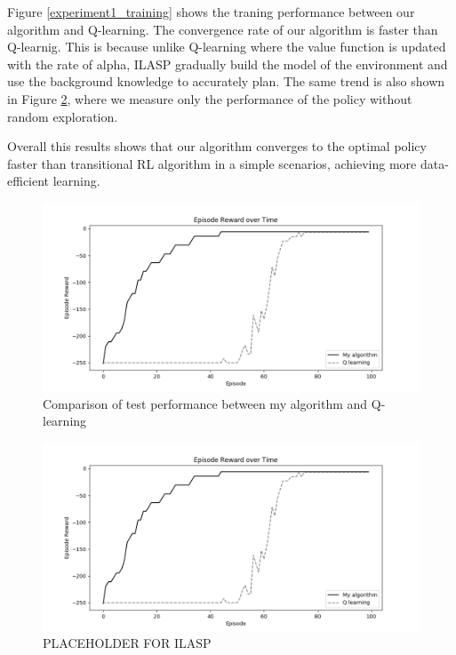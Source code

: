 Figure \ref{experiment1_training} shows the traning performance between our algorithm and Q-learning.
The convergence rate of our algorithm is faster than Q-learnig. This is because unlike Q-learning where the value function is updated with the rate of alpha, 
ILASP gradually build the model of the environment and use the background knowledge to accurately plan. 
The same trend is also shown in Figure \ref{experiment1_test}, where we measure only the performance of the policy without random exploration.

Overall this results shows that our algorithm converges to the optimal policy faster than transitional RL algorithm in a simple scenarios, achieving more data-efficient learning.

\begin{figure}[!htb]
\centering
\includegraphics[width=1.0\textwidth]{./figures/experiment1_test}
\caption{Comparison of test performance between my algorithm and Q-learning}
\label{experiment1_test}
\end{figure}

\begin{figure}[!htb]
\centering
\includegraphics[width=1.0\textwidth]{./figures/experiment1_test}
\caption{PLACEHOLDER FOR ILASP}
\label{experiment1_test}
\end{figure}

